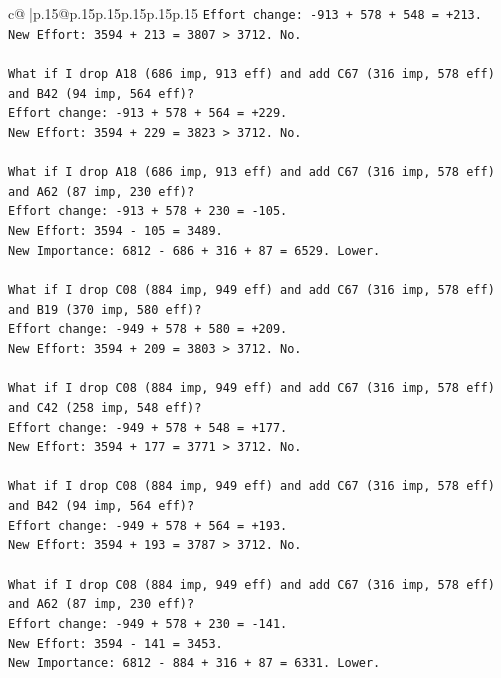 \documentclass{article}
\begin{document}
{\begin{supertabular}{c@{$\;$}|p{.15\linewidth}@{}p{.15\linewidth}p{.15\linewidth}p{.15\linewidth}p{.15\linewidth}p{.15\linewidth}}
{{{\texttt{Effort change: {-}913 + 578 + 548 = +213.} \\
\texttt{New Effort: 3594 + 213 = 3807 > 3712. No.} \\
\\ 
\texttt{What if I drop A18 (686 imp, 913 eff) and add C67 (316 imp, 578 eff) and B42 (94 imp, 564 eff)?} \\
\texttt{Effort change: {-}913 + 578 + 564 = +229.} \\
\texttt{New Effort: 3594 + 229 = 3823 > 3712. No.} \\
\\ 
\texttt{What if I drop A18 (686 imp, 913 eff) and add C67 (316 imp, 578 eff) and A62 (87 imp, 230 eff)?} \\
\texttt{Effort change: {-}913 + 578 + 230 = {-}105.} \\
\texttt{New Effort: 3594 {-} 105 = 3489.} \\
\texttt{New Importance: 6812 {-} 686 + 316 + 87 = 6529. Lower.} \\
\\ 
\texttt{What if I drop C08 (884 imp, 949 eff) and add C67 (316 imp, 578 eff) and B19 (370 imp, 580 eff)?} \\
\texttt{Effort change: {-}949 + 578 + 580 = +209.} \\
\texttt{New Effort: 3594 + 209 = 3803 > 3712. No.} \\
\\ 
\texttt{What if I drop C08 (884 imp, 949 eff) and add C67 (316 imp, 578 eff) and C42 (258 imp, 548 eff)?} \\
\texttt{Effort change: {-}949 + 578 + 548 = +177.} \\
\texttt{New Effort: 3594 + 177 = 3771 > 3712. No.} \\
\\ 
\texttt{What if I drop C08 (884 imp, 949 eff) and add C67 (316 imp, 578 eff) and B42 (94 imp, 564 eff)?} \\
\texttt{Effort change: {-}949 + 578 + 564 = +193.} \\
\texttt{New Effort: 3594 + 193 = 3787 > 3712. No.} \\
\\ 
\texttt{What if I drop C08 (884 imp, 949 eff) and add C67 (316 imp, 578 eff) and A62 (87 imp, 230 eff)?} \\
\texttt{Effort change: {-}949 + 578 + 230 = {-}141.} \\
\texttt{New Effort: 3594 {-} 141 = 3453.} \\
\texttt{New Importance: 6812 {-} 884 + 316 + 87 = 6331. Lower.} \\
}}}
\end{supertabular}}
\end{document}
